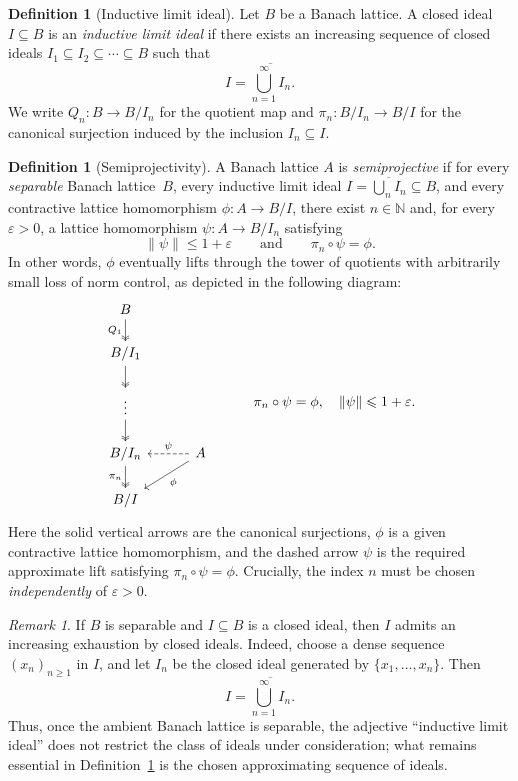 \documentclass[11pt]{amsart}
\renewcommand{\le}{\leqslant}
\renewcommand{\ge}{\geqslant}
\numberwithin{equation}{section}
\theoremstyle{definition}
\newtheorem{definition}[theorem]{Definition}
\theoremstyle{remark}
\newtheorem{remark}[theorem]{Remark}
\theoremstyle{plain}
\begin{document}
\begin{definition}[Inductive limit ideal]\label{def:ili}
Let $B$ be a Banach lattice.
A closed ideal $I\subseteq B$ is an \emph{inductive limit ideal} if there exists
an increasing sequence of closed ideals $I_1\subseteq I_2\subseteq \cdots\subseteq B$ such that
\[
I=\overline{\bigcup_{n=1}^\infty I_n}.
\]
We write $Q_n\colon B\to B/I_n$ for the quotient map and
$\pi_n\colon B/I_n\to B/I$ for the canonical surjection induced by the
inclusion $I_n\subseteq I$.
\end{definition}

\begin{definition}[Semiprojectivity]\label{def:semi}
A Banach lattice $A$ is \emph{semiprojective} if for every \emph{separable} Banach lattice~$B$,
every inductive limit ideal $I=\overline{\bigcup_n I_n}\subseteq B$,
and every contractive lattice homomorphism $\phi\colon A\to B/I$,
there exist $n\in\mathbb N$ and, for every $\varepsilon>0$,
a lattice homomorphism $\psi\colon A\to B/I_n$ satisfying
\[
\|\psi\|\le 1+\varepsilon
\qquad\text{and}\qquad
\pi_n\circ \psi=\phi.
\]
In other words, $\phi$ eventually lifts through the tower of quotients with arbitrarily
small loss of norm control, as depicted in the following diagram:
\[
\begin{tikzcd}[row sep=1.6em, column sep=3em]
B \arrow[d, two heads, "Q_1"'] \\
B/I_1 \arrow[d, two heads] \\
\vdots \arrow[d, two heads] \\
B/I_n \arrow[d, two heads, "\pi_n"'] & A \arrow[l, dashed, "\psi"'] \arrow[dl, "\phi"] \\
B/I
\end{tikzcd}
\qquad\quad \pi_n\circ\psi=\phi,\quad \|\psi\|\le 1+\varepsilon.
\]
Here the solid vertical arrows are the canonical surjections,
$\phi$ is a given contractive lattice homomorphism, and the dashed arrow $\psi$ is
the required approximate lift satisfying $\pi_n\circ \psi=\phi$.
Crucially, the index $n$ must be chosen \emph{independently} of $\varepsilon>0$.
\end{definition}

\begin{remark}\label{rem:countable-exhaustion}
If $B$ is separable and $I\subseteq B$ is a closed ideal, then $I$ admits an
increasing exhaustion by closed ideals. Indeed, choose a dense sequence
$(x_n)_{n\ge 1}$ in $I$, and let $I_n$ be the closed ideal generated by
$\{x_1,\dots,x_n\}$. Then
\[
I=\overline{\bigcup_{n=1}^\infty I_n}.
\]
Thus, once the ambient Banach lattice is separable, the adjective
``inductive limit ideal'' does not restrict the class of ideals under
consideration; what remains essential in Definition~\ref{def:semi} is the
chosen approximating sequence of ideals.
\end{remark}
\end{document}
